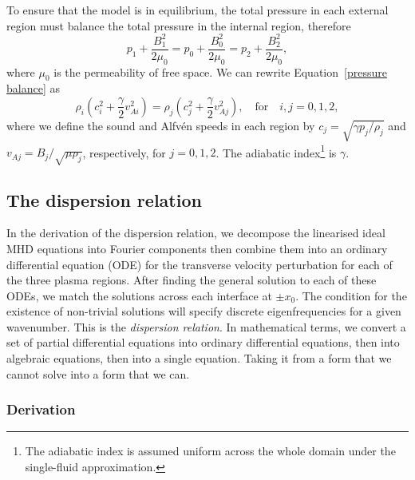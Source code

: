 To ensure that the model is in equilibrium, the total pressure in each external region must balance the total pressure in the internal region, therefore
\begin{equation}
	p_1 + \frac{B_1^2}{2\mu_0} = p_0 + \frac{B_0^2}{2\mu_0} = p_2 + \frac{B_2^2}{2\mu_0}, \label{pressure balance}
\end{equation}
where $\mu_0$ is the permeability of free space. We can rewrite Equation~\eqref{pressure balance} as
\begin{equation}
\rho_i\left(c_i^2 + \frac{\gamma}{2}v_{Ai}^2\right) = \rho_j\left(c_j^2 + \frac{\gamma}{2}v_{Aj}^2\right), \quad \text{for} \quad i, j = 0, 1, 2, \label{sound and density}
\end{equation}
where we define the sound and Alfv\'{e}n speeds in each region by $c_j = \sqrt{\gamma p_j/\rho_j}$ and $v_{Aj} = B_j/\sqrt{\mu\rho_j}$, respectively, for $j = 0, 1, 2$. The adiabatic index\footnote{The adiabatic index is assumed uniform across the whole domain under the single-fluid approximation.} is $\gamma$.


\subsection{The dispersion relation}

In the derivation of the dispersion relation, we decompose the linearised ideal MHD equations into Fourier components then combine them into an ordinary differential equation (ODE) for the transverse velocity perturbation for each of the three plasma regions. After finding the general solution to each of these ODEs, we match the solutions across each interface at $\pm x_0$. The condition for the existence of non-trivial solutions will specify discrete eigenfrequencies for a given wavenumber. This is the \textit{dispersion relation}. In mathematical terms, we convert a set of partial differential equations into ordinary differential equations, then into algebraic equations, then into a single equation. Taking it from a form that we cannot solve into a form that we can.


\subsubsection{Derivation} \label{sec: asym slab DR der}

